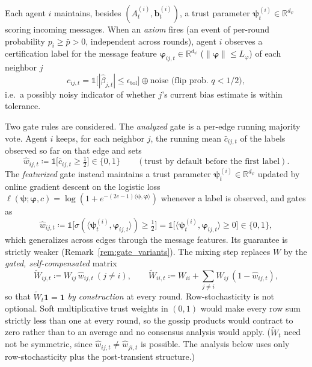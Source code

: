 \documentclass[11pt]{article}
\begin{document}
Each agent $i$ maintains, besides $(A_t^{(i)},\bm{b}_t^{(i)})$, a trust
parameter $\bm{\psi}_t^{(i)}\in\mathbb{R}^{d_\psi}$ scoring incoming
messages.  When an \emph{axiom} fires (an event of per-round
probability $p_i\geq\bar p>0$, independent across rounds), agent $i$
observes a certification label for the message feature
$\bm{\varphi}_{ij,t}\in\mathbb{R}^{d_\psi}$ ($\|\bm{\varphi}\|\leq
L_\varphi$) of each neighbor $j$ \[
c_{ij,t}=\mathbb{1}\bigl[|\hat\beta_{j,t}|\leq\epsilon_{\mathrm{tol}}\bigr]
\oplus\text{noise (flip prob.\ }q<1/2),
\]
i.e.\ a possibly noisy indicator of whether $j$'s current bias estimate
is within tolerance.

Two gate rules are considered.  The \emph{analyzed} gate is a per-edge
running majority vote. Agent $i$ keeps, for each neighbor $j$, the
running mean $\bar c_{ij,t}$ of the labels observed so far on that
edge and sets
\begin{equation}
\widehat w_{ij,t}\coloneqq
\mathbb{1}\bigl[\bar c_{ij,t}\geq\tfrac12\bigr]\in\{0,1\}
\qquad(\text{trust by default before the first label}).
\label{eq:mv_gate}
\end{equation}
The \emph{featurized} gate instead maintains a trust parameter
$\bm{\psi}_t^{(i)}\in\mathbb{R}^{d_\psi}$ updated by online gradient
descent on the logistic loss
$\ell(\bm\psi;\bm\varphi,c)=\log(1+e^{-(2c-1)\langle\bm\psi,\bm\varphi\rangle})$
whenever a label is observed, and gates as
\begin{equation}
\widehat w_{ij,t}\coloneqq
\mathbb{1}\bigl[\sigma(\langle\bm{\psi}_t^{(i)},\bm{\varphi}_{ij,t}\rangle)\geq\tfrac12\bigr]
=\mathbb{1}\bigl[\langle\bm{\psi}_t^{(i)},\bm{\varphi}_{ij,t}\rangle\geq 0\bigr]
\in\{0,1\},
\label{eq:hard_gate}
\end{equation}
which generalizes across edges through the message features. Its
guarantee is strictly weaker (Remark~\ref{rem:gate_variants}).
The mixing step replaces $W$ by the \emph{gated, self-compensated}
matrix
\begin{equation}
\widetilde W_{ij,t}\coloneqq W_{ij}\,\widehat w_{ij,t}\ (j\neq i),
\qquad
\widetilde W_{ii,t}\coloneqq W_{ii}+\sum_{j\neq i}W_{ij}\,(1-\widehat w_{ij,t}),
\label{eq:row_stoch}
\end{equation}
so that $\widetilde W_t\bm{1}=\bm{1}$ \emph{by construction} at every
round.  Row-stochasticity is not optional. Soft multiplicative trust
weights in $(0,1)$ would make every row sum strictly less than one at
every round, so the gossip products would contract to zero rather than
to an average and no consensus analysis would apply.
($\widetilde W_t$ need not be symmetric, since
$\widehat w_{ij,t}\neq\widehat w_{ji,t}$ is possible. The analysis
below uses only row-stochasticity plus the post-transient structure.)
\end{document}
